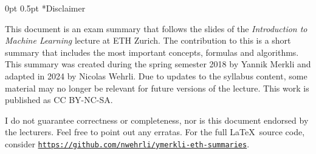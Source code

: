 \documentclass[11pt,landscape,a4paper,fleqn]{article}
\makeatletter
\renewcommand{\section}{\@startsection{section}{1}{0mm}%
                                {0pt}%
                                {0.5pt}%
                                {\color{myorange}\sffamily\small\bfseries}}
\makeatother
\begin{document}
	
\section*{Disclaimer}

\small
\begin{multicols*}{4}
	
This document is an exam summary that follows the slides of the \textit{Introduction to Machine Learning} lecture  at ETH Zurich. 
The contribution to this is a short summary that includes the most important concepts, formulas and algorithms. 
This summary was created during the spring semester 2018 by Yannik Merkli and adapted in 2024 by Nicolas Wehrli. 
Due to updates to the syllabus content, some material may no longer be relevant for future versions of the 
lecture. This work is published as CC BY-NC-SA.

\begin{center}
	\ccbyncsa
\end{center}

I do not guarantee correctness or completeness, nor is this document endorsed by the lecturers. 
Feel free to point out any erratas. 
For the full \LaTeX \ source code, consider \texttt{\href{https://github.com/nwehrli/ymerkli-eth-summaries}{https://github.com/nwehrli/ymerkli-eth-summaries}}.

\newpage
	
%














\end{multicols*}
\end{document}
